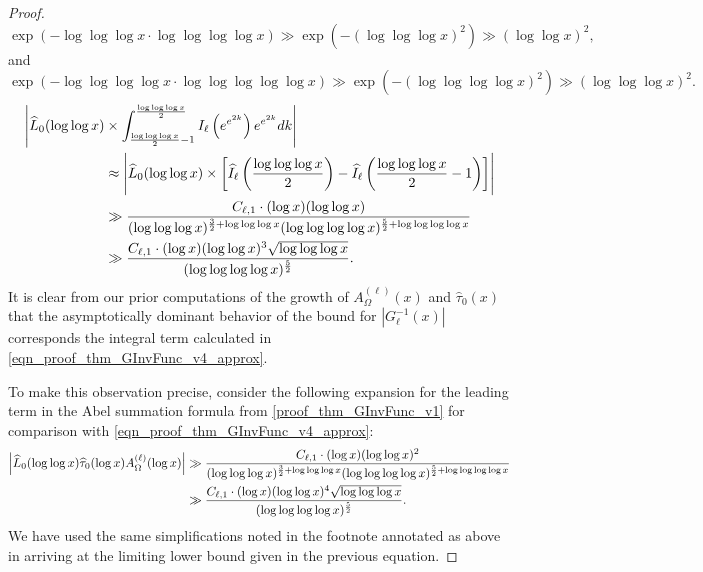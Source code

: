 \documentclass[11pt,reqno,a4letter]{article}
\numberwithin{figure}{section}
\numberwithin{table}{section}
\theoremstyle{plain}
\numberwithin{theorem}{section}
\theoremstyle{definition}
\newcommand{\SuccSim}[0]{\overset{_{\scriptsize{\blacktriangle}}}{\succsim}}
\renewcommand{\SuccSim}[0]{\ensuremath{\gg}}
\begin{document}
\begin{proof}
{     \[
     \exp\left(-\log\log\log x \cdot \log\log\log\log x\right) \SuccSim 
          \exp\left(-(\log\log\log x)^2\right) \SuccSim 
          (\log\log x)^2,  
     \]
     and 
     \[
     \exp\left(-\log\log\log\log x \cdot \log\log\log\log\log x\right) \SuccSim 
          \exp\left(-(\log\log\log\log x)^2\right) \SuccSim 
          (\log\log\log x)^2.  
     \]
} 
\begin{align} 
\notag 
\Biggl\lvert \widehat{L}_0(\log\log x) & 
     \times \int_{\frac{\log\log\log x}{2}-1}^{\frac{\log\log\log x}{2}} 
     I_{\ell}\left(e^{e^{2k}}\right) 
     e^{e^{2k}} dk \Biggr\rvert \\ 
\notag 
     & \approx \Biggl\lvert \widehat{L}_0(\log\log x) \times \left[ 
     \widehat{I}_{\ell}\left(\frac{\log\log\log x}{2}\right) - 
     \widehat{I}_{\ell}\left(\frac{\log\log\log x}{2}-1\right)
     \right] \Biggr\rvert \\ 
\notag 
     & \gg \frac{C_{\ell,1} \cdot (\log x) (\log\log x)}{(\log\log\log x)^{\frac{3}{2} + \log\log\log x} 
     (\log\log\log\log x)^{\frac{5}{2} + \log\log\log\log x}} \\ 
\label{eqn_proof_thm_GInvFunc_v4_approx} 
     & \SuccSim 
     \frac{C_{\ell,1} \cdot (\log x) (\log\log x)^{3} \sqrt{\log\log\log x}}{ 
     (\log\log\log\log x)^{\frac{5}{2}}}. 
\end{align} 
It is clear from our prior computations of the growth of 
$A_{\Omega}^{(\ell)}(x)$ and $\widehat{\tau}_0(x)$ 
that the asymptotically dominant behavior of the bound for 
$|G_{\ell}^{-1}(x)|$ corresponds the integral term calculated in 
\eqref{eqn_proof_thm_GInvFunc_v4_approx}. 

To make this observation precise, consider the following expansion for the leading term in 
the Abel summation formula from \eqref{proof_thm_GInvFunc_v1} for comparison with 
\eqref{eqn_proof_thm_GInvFunc_v4_approx}: 
\begin{align} 
\notag 
\left\lvert \widehat{L}_0(\log\log x) \widehat{\tau}_0(\log x) A_{\Omega}^{(\ell)}(\log x) \right\rvert 
\notag 
     & \gg \frac{C_{\ell,1} \cdot (\log x) (\log\log x)^2}{(\log\log\log x)^{\frac{3}{2} + \log\log\log x} 
     (\log\log\log\log x)^{\frac{5}{2} + \log\log\log\log x}} \\ 
\label{eqn_proof_thm_GInvFunc_v5_approx} 
     & \SuccSim 
     \frac{C_{\ell,1} \cdot (\log x) (\log\log x)^{4} \sqrt{\log\log\log x}}{ 
     (\log\log\log\log x)^{\frac{5}{2}}}. 
\end{align} 
We have used the same simplifications noted in the footnote annotated as above in arriving at the 
limiting lower bound given in the previous equation. 
\end{proof} 
\end{document}
